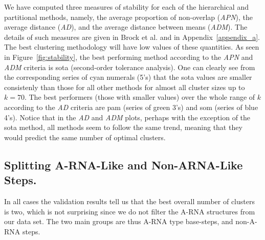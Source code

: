 We  have  computed  three  measures  of  stability  for  each  of  the
hierarchical and  partitional methods, namely,  the average proportion
of non-overlap (\textit{APN}), the average distance (\textit{AD}), and
the  average distance  between means  (\textit{ADM}).  The  details of
such  measures are  given in  Brock  et al.   \cite{brock2008} and  in
Appendix~\ref{appendix_a}. The  best clustering methodology  will have
low     values     of     these     quantities.     As     seen     in
Figure~\ref{fig:stability},  the best  performing method  according to
the  \textit{APN}  and  \textit{ADM}  criteria is  sota  (second-order
tolerance analysis). One can clearly see from the corresponding series
of cyan  numerals (5's) that  the sota values are  smaller consistenly
than those  for all other methods  for almost all cluster  sizes up to
$k=70$.   The best  performers (those  with smaller  values)  over the
whole  range of  $k$ according  to  the \textit{AD}  criteria are  pam
(series of green 3's) and som (series of blue 4's). Notice that in the
\textit{AD} and \textit{ADM} plots,  perhaps with the exception of the
sota method, all  methods seem to follow the  same trend, meaning that
they would predict the same number of optimal clusters.

\subsection{Splitting A-RNA-Like and Non-ARNA-Like Steps.}
In  all cases the  validation results  tell us  that the  best overall
number of  clusters is two,  which is not  surprising since we  do not
filter the  A-RNA structures from our  data set.  The  two main groups
are thus A-RNA type base-steps, and non-A-RNA steps.

